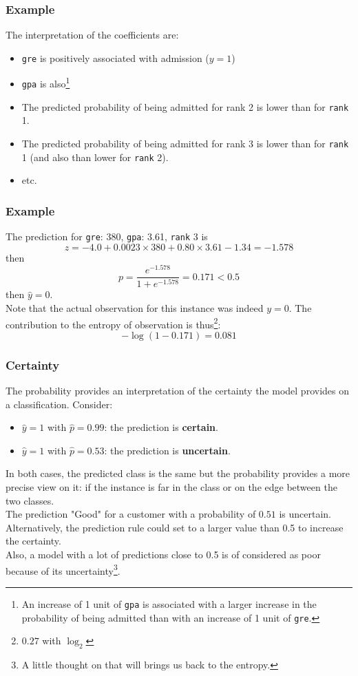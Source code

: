 \begin{frame}
\frametitle{Example}
The interpretation of the coefficients are:
\begin{itemize}
\item {\tt gre} is positively associated with admission ($y=1$)
\item {\tt gpa} is also\footnote{An increase of 1 unit of {\tt gpa} is associated with a larger increase in the probability of being admitted than with an increase of 1 unit of {\tt gre}.} 
\item The predicted probability of being admitted for rank 2 is lower than for {\tt rank} 1.
\item The predicted probability of being admitted for rank 3 is lower than for {\tt rank} 1 (and also than lower for {\tt rank} 2).
\item etc.
\end{itemize}
\end{frame}
\begin{frame}
\frametitle{Example}
The prediction for {\tt gre}: 380, {\tt gpa}: 3.61, {\tt rank} 3 is
$$
z = -4.0 + 0.0023\times 380 + 0.80\times 3.61 - 1.34 = -1.578
$$
then
$$
p = \frac{e^{-1.578}}{1+e^{-1.578}} = 0.171 < 0.5
$$
then $\hat{y}=0$.\\ 
\vspace{0.2cm}
Note that the actual observation for this instance was indeed $y=0$. The contribution to the entropy of observation is thus\footnote{$0.27$ with $\log_2$}:
$$
-\log(1-0.171) = 0.081
$$
\end{frame}
\begin{frame}
\frametitle{Certainty}
The probability provides an interpretation of the certainty the model provides on a classification. Consider: 
\begin{itemize}
\item $\hat{y}=1$ with $\hat{p} = 0.99$: the prediction is {\bf certain}.
\item $\hat{y}=1$ with $\hat{p} = 0.53$: the prediction is {\bf uncertain}.
\end{itemize}
In both cases, the predicted class is the same but the probability provides a more precise view on it: if the instance is far in the class or on the edge between the two classes.\\
\vspace{0.2cm}
The prediction "Good" for a customer with a probability of $0.51$ is uncertain. Alternatively, the prediction rule could set to a larger value than 0.5 to increase the certainty. \\
\vspace{0.2cm}
Also, a model with a lot of predictions close to 0.5 is of considered as poor because of its uncertainty\footnote{A little thought on that will brings us back to the entropy.}.
\end{frame}


